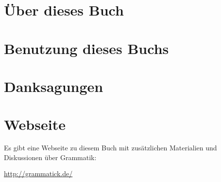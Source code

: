 

\section*{Über dieses Buch}
\label{sec:ueberdiesesbuch}

\section*{Benutzung dieses Buchs}
\label{sec:benutzungdiesesbuchs}

\section*{Danksagungen}
\label{sec:danksagungen}

\section*{Webseite}
\label{sec:webseite}

Es gibt eine Webseite zu diesem Buch mit zusätzlichen Materialien und Diskussionen über Grammatik:

\begin{center}
  \url{http://grammatick.de/}
\end{center}

